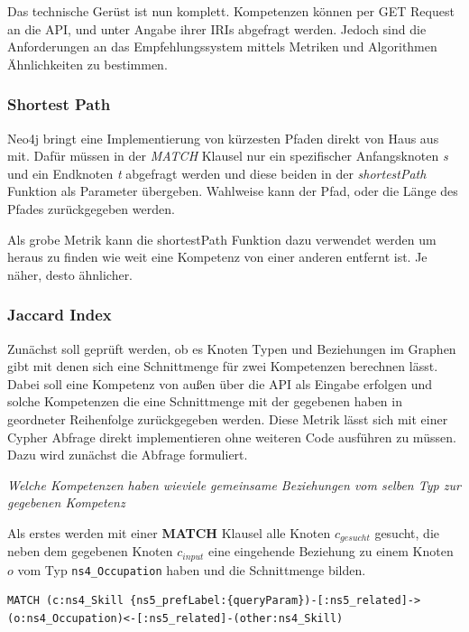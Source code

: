 Das technische Gerüst ist nun komplett. Kompetenzen können per GET Request an die API, und unter Angabe ihrer IRIs abgefragt werden. Jedoch sind die Anforderungen an das Empfehlungssystem mittels Metriken und Algorithmen Ähnlichkeiten zu bestimmen. 

\subsubsection{Shortest Path}

Neo4j bringt eine Implementierung von kürzesten Pfaden direkt von Haus aus mit. Dafür müssen in der \textit{MATCH} Klausel nur ein spezifischer Anfangsknoten \textit{s} und ein Endknoten \textit{t} abgefragt werden und diese beiden in der \textit{shortestPath} Funktion als Parameter übergeben. Wahlweise kann der Pfad, oder die Länge des Pfades zurückgegeben werden.
\newline

Als grobe Metrik kann die shortestPath Funktion dazu verwendet werden um heraus zu finden wie weit eine Kompetenz von einer anderen entfernt ist. Je näher, desto ähnlicher. 

\subsubsection{Jaccard Index}

Zunächst soll geprüft werden, ob es Knoten Typen und Beziehungen im Graphen gibt mit denen sich eine Schnittmenge für zwei Kompetenzen berechnen lässt. Dabei soll eine Kompetenz von außen über die API als Eingabe erfolgen und solche Kompetenzen die eine Schnittmenge mit der gegebenen haben in geordneter Reihenfolge zurückgegeben werden. Diese Metrik lässt sich mit einer Cypher Abfrage direkt implementieren ohne weiteren Code ausführen zu müssen. Dazu wird zunächst die Abfrage formuliert. 

\textit{Welche Kompetenzen haben wieviele gemeinsame Beziehungen vom selben Typ zur gegebenen Kompetenz}
\newline

Als erstes werden mit einer \textbf{MATCH} Klausel alle Knoten $c_{gesucht}$ gesucht, die neben dem gegebenen Knoten $c_{input}$ eine eingehende Beziehung zu einem Knoten $o$ vom Typ \texttt{ns4\_Occupation} haben und die Schnittmenge bilden. 
\newline

\begin{lstlisting}
MATCH (c:ns4_Skill {ns5_prefLabel:{queryParam})-[:ns5_related]->(o:ns4_Occupation)<-[:ns5_related]-(other:ns4_Skill)
\end{lstlisting}



